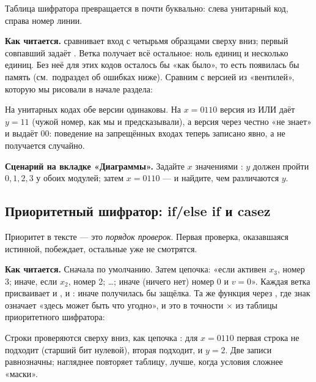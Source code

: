 Таблица шифратора превращается в  почти буквально: слева
унитарный код, справа номер линии.


\textbf{Как читается.}  сравнивает вход с четырьмя
образцами сверху вниз; первый совпавший задаёт . Ветка
 получает всё остальное: ноль единиц и несколько единиц.
Без неё для этих кодов  осталось бы «как было», то есть появилась бы
память (см.\ подраздел об ошибках ниже). Сравним с версией из «вентилей»,
которую мы рисовали в начале раздела:


На унитарных кодах обе версии одинаковы. На $x=0110$ версия из ИЛИ даёт
$y=11$ (чужой номер, как мы и предсказывали), а версия через 
честно «не знает» и выдаёт $00$: поведение на запрещённых входах теперь
записано явно, а не получается случайно.


\textbf{Сценарий на вкладке «Диаграммы».} Задайте $x$ значениями
: $y$ должен пройти $0,1,2,3$ у обоих модулей;
затем $x=0110$ --- и найдите, чем различаются $y$.

\subsection{Приоритетный шифратор: if/else if и casez}

Приоритет в тексте --- это \emph{порядок проверок}. Первая проверка,
оказавшаяся истинной, побеждает, остальные уже не смотрятся.


\textbf{Как читается.} Сначала  по умолчанию. Затем цепочка:
«если активен $x_3$, номер 3; иначе, если $x_2$, номер 2; \ldots; иначе
(ничего нет) номер 0 и $v=0$». Каждая ветка присваивает и , и :
иначе получилась бы защёлка. Та же функция через , где знак
 означает «здесь может быть что угодно», и это в точности
$\times$ из таблицы приоритетного шифратора:


Строки  проверяются сверху вниз, как цепочка : для
$x=0110$ первая строка не подходит (старший бит нулевой), вторая
 подходит, и $y=2$. Две записи равнозначны;  нагляднее
повторяет таблицу,  лучше, когда условия сложнее «маски».

